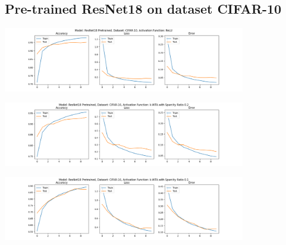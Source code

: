 \documentclass[a4paper]{article}
\begin{document}
		\subsection{Pre-trained ResNet18 on dataset CIFAR-10}
			\begin{center}
				\centering
				\includegraphics[width=400px,keepaspectratio]{Results/ResNet18_CIFAR-10_ReLU_Pretrained.png}
			\end{center}
			\begin{center}
				\centering
				\includegraphics[width=400px,keepaspectratio]{Results/ResNet18_CIFAR-10_k-WTA_0.2_Pretrained.png}
			\end{center}
			\begin{center}
				\centering
				\includegraphics[width=400px,keepaspectratio]{Results/ResNet18_CIFAR-10_k-WTA_0.1_Pretrained.png}
			\end{center}
\end{document}
